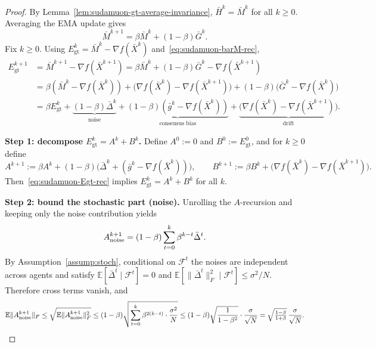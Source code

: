 \documentclass{article}
\begin{document}
\begin{proof}
By Lemma~\ref{lem:sudamuon-gt-average-invariance}, $\bar H^k=\bar M^k$ for all $k\ge 0$.
Averaging the EMA update gives
\begin{equation}
\label{eq:sudamuon-barM-rec}
\bar M^{k+1}=\beta\bar M^k+(1-\beta)\bar G^k.
\end{equation}
Fix $k\ge 0$. Using $E_{\mathrm{gt}}^k=\bar M^k-\nabla f(\bar X^k)$ and~\eqref{eq:sudamuon-barM-rec},
\begin{align}
E_{\mathrm{gt}}^{k+1}
&=\bar M^{k+1}-\nabla f(\bar X^{k+1})
=\beta\bar M^k+(1-\beta)\bar G^k-\nabla f(\bar X^{k+1})\nonumber\\
&=\beta(\bar M^k-\nabla f(\bar X^k))
+\bigl(\nabla f(\bar X^k)-\nabla f(\bar X^{k+1})\bigr)
+(1-\beta)\bigl(\bar G^k-\nabla f(\bar X^k)\bigr)\nonumber\\
&=\beta E_{\mathrm{gt}}^{k}
+\underbrace{(1-\beta)\bar\Delta^k}_{\text{noise}}
+\underbrace{(1-\beta)(\bar g^k-\nabla f(\bar X^k))}_{\text{consensus bias}}
+\underbrace{\bigl(\nabla f(\bar X^k)-\nabla f(\bar X^{k+1})\bigr)}_{\text{drift}}.
\label{eq:sudamuon-Egt-rec}
\end{align}

\medskip\noindent\textbf{Step 1: decompose $E_{\mathrm{gt}}^k=A^k+B^k$.}
Define $A^0:=0$ and $B^0:=E_{\mathrm{gt}}^0$, and for $k\ge 0$ define
\[
A^{k+1}:=\beta A^k+(1-\beta)\bigl(\bar\Delta^k+(\bar g^k-\nabla f(\bar X^k))\bigr),
\qquad
B^{k+1}:=\beta B^k+\bigl(\nabla f(\bar X^k)-\nabla f(\bar X^{k+1})\bigr).
\]
Then~\eqref{eq:sudamuon-Egt-rec} implies $E_{\mathrm{gt}}^{k}=A^{k}+B^{k}$ for all $k$.

\medskip\noindent\textbf{Step 2: bound the stochastic part (noise).}
Unrolling the $A$-recursion and keeping only the noise contribution yields
\[
A_{\rm noise}^{k+1}=(1-\beta)\sum_{t=0}^{k}\beta^{k-t}\bar\Delta^t.
\]
By Assumption~\ref{assump:stoch}, conditional on $\mathcal F^t$ the noises are independent across agents and satisfy
$\mathbb{E}[\bar\Delta^t\mid \mathcal F^t]=0$ and
$\mathbb{E}[\|\bar\Delta^t\|_F^2\mid \mathcal F^t]\le \sigma^2/N$.
Therefore cross terms vanish, and
\[
\mathbb{E}\|A_{\rm noise}^{k+1}\|_F
\le \sqrt{\mathbb{E}\|A_{\rm noise}^{k+1}\|_F^2}
\le (1-\beta)\sqrt{\sum_{t=0}^{k}\beta^{2(k-t)}\cdot \frac{\sigma^2}{N}}
\le (1-\beta)\sqrt{\frac{1}{1-\beta^2}}\cdot \frac{\sigma}{\sqrt N}
=\sqrt{\tfrac{1-\beta}{1+\beta}}\,\frac{\sigma}{\sqrt N}.
\]


\end{proof}
\end{document}
